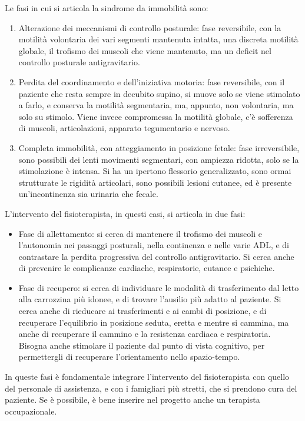 Le fasi in cui si articola la sindrome da immobilità sono:
\begin{enumerate}
\item Alterazione dei meccanismi di controllo posturale: fase reversibile, con
la motilità volontaria dei vari segmenti mantenuta intatta, una discreta
motilità globale, il trofismo dei muscoli che viene mantenuto, ma un deficit nel
controllo posturale antigravitario.
\item Perdita del coordinamento e dell'iniziativa motoria: fase reversibile, con
il paziente che resta sempre in decubito supino, si muove solo se viene
stimolato a farlo, e conserva la motilità segmentaria, ma, appunto, non
volontaria, ma solo su stimolo. Viene invece compromessa la motilità globale,
c'è sofferenza di muscoli, articolazioni, apparato tegumentario e nervoso.
\item Completa immobilità, con atteggiamento in posizione fetale: fase
irreversibile, sono possibili dei lenti movimenti segmentari, con ampiezza
ridotta, solo se la stimolazione è intensa. Si ha un ipertono flessorio
generalizzato, sono ormai strutturate le rigidità articolari, sono possibili
lesioni cutanee, ed è presente un'incontinenza sia urinaria che fecale.
\end{enumerate}

L'intervento del fisioterapista, in questi casi, si articola in due fasi:
\begin{itemize}
\item Fase di allettamento: si cerca di mantenere il trofismo dei muscoli e
l'autonomia nei passaggi posturali, nella continenza e nelle varie ADL, e di
contrastare la perdita progressiva del controllo antigravitario. Si cerca anche
di prevenire le complicanze cardiache, respiratorie, cutanee e psichiche.
\item Fase di recupero: si cerca di individuare le modalità di trasferimento dal
letto alla carrozzina più idonee, e di trovare l'ausilio più adatto al paziente.
Si cerca anche di rieducare ai trasferimenti e ai cambi di posizione, e di
recuperare l'equilibrio in posizione seduta, eretta e mentre si cammina, ma
anche di recuperare il cammino e la resistenza cardiaca e respiratoria. Bisogna
anche stimolare il paziente dal punto di vista cognitivo, per permettergli di
recuperare l'orientamento nello spazio-tempo.
\end{itemize}

In queste fasi è fondamentale integrare l'intervento del fisioterapista con
quello del personale di assistenza, e con i famigliari più stretti, che si
prendono cura del paziente. Se è possibile, è bene inserire nel progetto anche
un terapista occupazionale.

